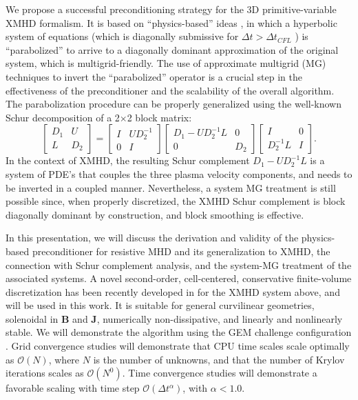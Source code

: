 \documentclass{report}
\begin{document}
We propose a successful preconditioning strategy for the 3D primitive-variable
XMHD formalism. It is based on {}``physics-based'' ideas
\cite{chacon-jcp-02,chacon-jcp-03},
in which a hyperbolic system of equations (which is diagonally submissive
for $\Delta t>\Delta t_{CFL}$ \cite{chacon-jcp-02}) is {}``parabolized''
to arrive to a diagonally dominant approximation of the original system,
which is multigrid-friendly. The use of approximate multigrid (MG)
techniques to invert the {}``parabolized'' operator is a crucial
step in the effectiveness of the preconditioner and the scalability
of the overall algorithm. The parabolization procedure can be properly
generalized using the well-known Schur decomposition of a 2$\times $2
block matrix:{\small \[
\left[\begin{array}{cc}
D_{1} & U\\
L & D_{2}\end{array}
\right]=\left[\begin{array}{cc}
I & UD_{2}^{-1}\\
0 & I\end{array}
\right]\left[\begin{array}{cc}
D_{1}-UD_{2}^{-1}L & 0\\
0 & D_{2}\end{array}
\right]\left[\begin{array}{cc}
I & 0\\
D_{2}^{-1}L & I\end{array}
\right].\]
}In the context of XMHD, the resulting Schur complement $D_{1}-UD_{2}^{-1}L$
is a system of PDE's that couples the three plasma velocity components,
and needs to be inverted in a coupled manner. Nevertheless, a system
MG treatment is still possible since, when properly discretized, the
XMHD Schur complement is block diagonally dominant by construction,
and block smoothing is effective.

In this presentation, we will discuss the derivation and validity
of the physics-based preconditioner for resistive MHD and its generalization
to XMHD, the connection with Schur complement analysis, and the system-MG
treatment of the associated systems. A novel second-order, cell-centered,
conservative finite-volume discretization has been recently developed
in \cite{chacon-cpc-04} for the XMHD system above, and will be used
in this work. It is suitable for general curvilinear geometries, solenoidal
in $\mathbf{B}$ and $\mathbf{J}$, numerically non-dissipative, and
linearly and nonlinearly stable. We will demonstrate the algorithm
using the GEM challenge configuration \cite{gem}. Grid convergence
studies will demonstrate that CPU time scales scale optimally as $\mathcal{O}(N)$,
where $N$ is the number of unknowns, and that the number of Krylov
iterations scales as $\mathcal{O}(N^{0})$. Time convergence studies
will demonstrate a favorable scaling with time step $\mathcal{O}(\Delta t^{\alpha })$,
with $\alpha <1.0$.
\end{document}
